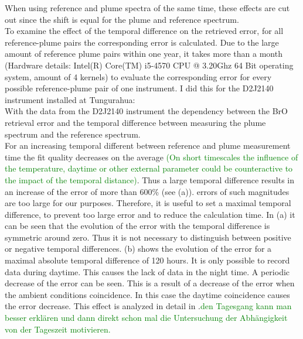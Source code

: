 When using reference and plume spectra of the same time, these effects are cut out since the shift is equal for the plume and reference spectrum.\\
To examine the effect of the temporal difference on the retrieved  error, for all reference-plume pairs the corresponding  error is calculated. Due to the large amount of reference plume pairs within one year, it takes more than a month (Hardware details: Intel(R) Core(TM) i5-4570 CPU @ 3.20Ghz 64 Bit operating system, amount of 4 kernels) to evaluate the corresponding  error for every possible reference-plume pair of one instrument. I did this for the  D2J2140 instrument installed at Tungurahua:\\
With the data from the D2J2140 instrument the dependency between the BrO retrieval error and the temporal difference between measuring the plume spectrum and the reference spectrum.\\
For an increasing temporal different between reference and plume measurement time the fit quality decreases on the average \textcolor{green}{(On short timescales the influence of the temperature, daytime or other external parameter could be counteractive to the impact of the temporal distance)}. Thus a large temporal difference results in an increase of the   error of more than 600\% (see  (a)).
 errors of such magnitudes are too large for our purposes. Therefore, it is useful to set a maximal temporal difference, to prevent too large  error and to reduce the calculation time.
%
In  (a) it can be seen that the evolution of the   error with the temporal difference is symmetric around zero. Thus it is not necessary to distinguish between positive or negative temporal differences.
%
 (b) shows the evolution of the  error for a maximal absolute temporal difference of 120 hours. It is only possible to record data during daytime. This causes the lack of data in the night time. A periodic decrease of the  error can be seen. This is a result of a decrease of the  error when the ambient conditions coincidence. In this case the daytime coincidence causes the   error decrease. This effect is analyzed in detail in .\textcolor{green}{den Tagesgang kann man besser erklären und dann direkt schon mal die Untersuchung der Abhängigkeit von der Tageszeit motivieren.}\\

